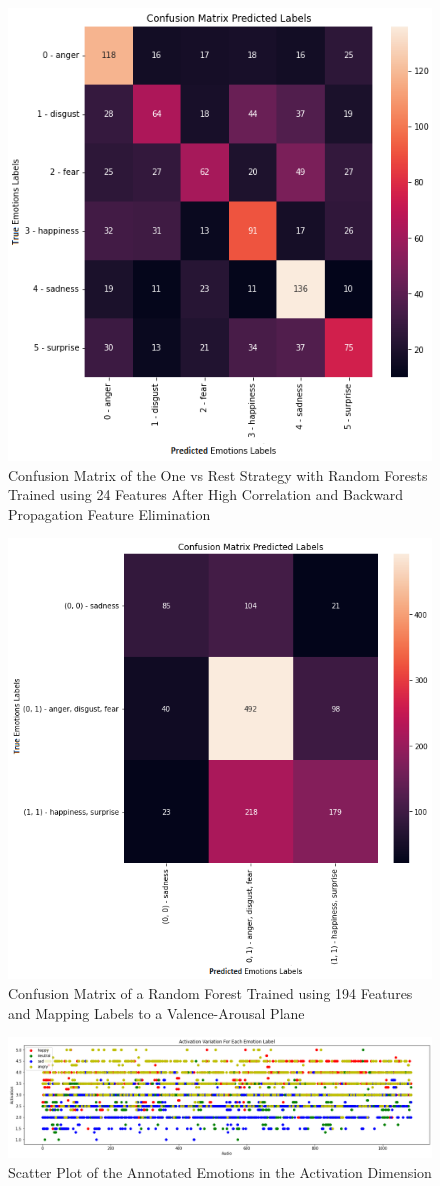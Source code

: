 \begin{figure}[H]
	\centering
	\includegraphics[width=.55\linewidth]{figs/appendix/feature_selection/cm5.png}
	\caption{Confusion Matrix of the One vs Rest Strategy with Random Forests Trained using 24 Features After High Correlation and Backward Propagation Feature Elimination}
	\label{fig:confMatrix5}
\end{figure}

\begin{figure}[H]
	\centering
	\includegraphics[width=.6\linewidth]{figs/appendix/feature_selection/cm6.png}
	\caption{Confusion Matrix of a Random Forest Trained using 194 Features and Mapping Labels to a Valence-Arousal Plane}
	\label{fig:confMatrix6}
\end{figure}

\begin{figure}[H]
	\centering
	\includegraphics[width=1\linewidth]{figs/appendix/IEMOCAP_data_study/activationScatterAllEmotions.png}
	\caption{Scatter Plot of the Annotated Emotions in the Activation Dimension}
	\label{fig:activationScatter}
\end{figure}

